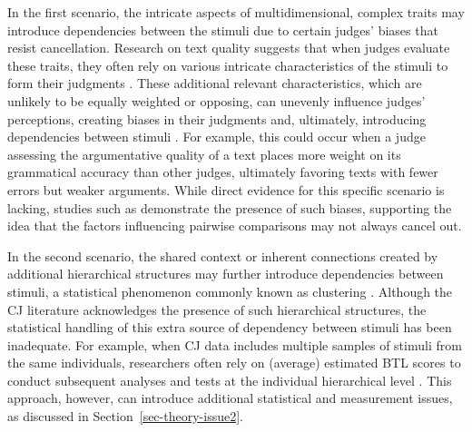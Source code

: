 \documentclass[
  authoryear,
  preprint,
  1p]{elsarticle}
\begin{document}
In the first scenario, the intricate aspects of multidimensional,
complex traits may introduce dependencies between the stimuli due to
certain judges' biases that resist cancellation. Research on text
quality suggests that when judges evaluate these traits, they often rely
on various intricate characteristics of the stimuli to form their
judgments
\citep{vanDaal_et_al_2016, Lesterhuis_2018, Chambers_et_al_2022}. These
additional relevant characteristics, which are unlikely to be equally
weighted or opposing, can unevenly influence judges' perceptions,
creating biases in their judgments and, ultimately, introducing
dependencies between stimuli
\citep[pp.~346]{vanderLinden_et_al_2017_II}. For example, this could
occur when a judge assessing the argumentative quality of a text places
more weight on its grammatical accuracy than other judges, ultimately
favoring texts with fewer errors but weaker arguments. While direct
evidence for this specific scenario is lacking, studies such as
\citet{Pollitt_et_al_2003} demonstrate the presence of such biases,
supporting the idea that the factors influencing pairwise comparisons
may not always cancel out.

In the second scenario, the shared context or inherent connections
created by additional hierarchical structures may further introduce
dependencies between stimuli, a statistical phenomenon commonly known as
clustering \citep{Everitt_et_al_2010}. Although the CJ literature
acknowledges the presence of such hierarchical structures, the
statistical handling of this extra source of dependency between stimuli
has been inadequate. For example, when CJ data includes multiple samples
of stimuli from the same individuals, researchers often rely on
(average) estimated BTL scores to conduct subsequent analyses and tests
at the individual hierarchical level
\citep{Bramley_et_al_2019, Boonen_et_al_2020, Bouwer_et_al_2023, vanDaal_et_al_2017, Jones_et_al_2019, Gijsen_et_al_2021}.
This approach, however, can introduce additional statistical and
measurement issues, as discussed in Section~\ref{sec-theory-issue2}.
\end{document}
